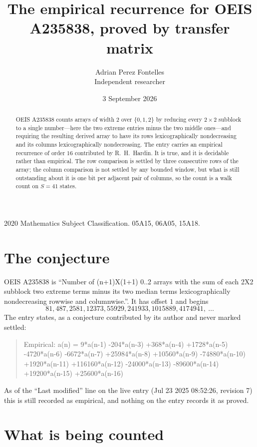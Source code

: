 \documentclass[11pt,a4paper]{article}
\title{The empirical recurrence for OEIS A235838, proved by transfer matrix}
\author{Adrian Perez Fontelles\\ \small Independent researcher}
\date{3 September 2026}
\theoremstyle{plain}
\theoremstyle{definition}
\begin{document}
\maketitle

\begin{abstract}
OEIS A235838 counts arrays of width $2$ over $\{0,1,2\}$ by reducing every $2\times2$ subblock to a
single number---here the two extreme entries minus the two middle ones---and requiring the resulting derived array to have its rows
lexicographically nondecreasing and its columns lexicographically nondecreasing. The entry carries an
empirical recurrence of order $16$ contributed by R.~H.~Hardin. It is true, and it is
decidable rather than empirical. The row comparison is settled by three consecutive rows of the
array; the column comparison is not settled by any bounded window, but what is still outstanding
about it is one bit per adjacent pair of columns, so the count is a walk count on $S=41$
states.
\end{abstract}

\noindent\small 2020 Mathematics Subject Classification. 05A15, 06A05, 15A18.\normalsize

\section{The conjecture}

OEIS A235838 is ``Number of (n+1)X(1+1) 0..2 arrays with the sum of each 2X2 subblock two extreme terms minus its two median terms lexicographically nondecreasing rowwise and columnwise.''. It has offset $1$ and begins
\[
81, 487, 2581, 12373, 55929, 241933, 1015889, 4174941,\ \dots
\]
The entry states, as a conjecture contributed by its author and never marked settled:
\begin{quote}
Empirical: a(n) = 9*a(n-1) -204*a(n-3) +368*a(n-4) +1728*a(n-5) -4720*a(n-6) -6672*a(n-7) +25984*a(n-8) +10560*a(n-9) -74880*a(n-10) +1920*a(n-11) +116160*a(n-12) -24000*a(n-13) -89600*a(n-14) +19200*a(n-15) +25600*a(n-16)
\end{quote}
As of the ``Last modified'' line on the live entry (Jul 23 2025 08:52:26, revision 7) this is still
recorded as empirical, and nothing on the entry records it as proved.

\section{What is being counted}
\end{document}
